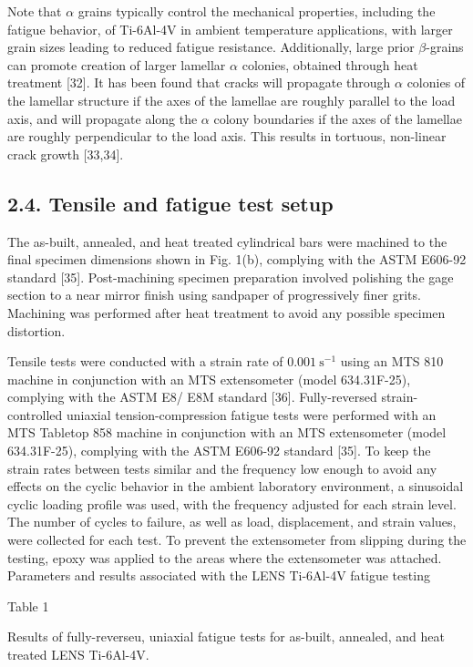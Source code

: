 \documentclass[10pt]{article}
\begin{document}
Note that $\alpha$ grains typically control the mechanical properties, including the fatigue behavior, of Ti-6Al-4V in ambient temperature applications, with larger grain sizes leading to reduced fatigue resistance. Additionally, large prior $\beta$-grains can promote creation of larger lamellar $\alpha$ colonies, obtained through heat treatment [32]. It has been found that cracks will propagate through $\alpha$ colonies of the lamellar structure if the axes of the lamellae are roughly parallel to the load axis, and will propagate along the $\alpha$ colony boundaries if the axes of the lamellae are roughly perpendicular to the load axis. This results in tortuous, non-linear crack growth [33,34].

\subsection*{2.4. Tensile and fatigue test setup}
The as-built, annealed, and heat treated cylindrical bars were machined to the final specimen dimensions shown in Fig. 1(b), complying with the ASTM E606-92 standard [35]. Post-machining specimen preparation involved polishing the gage section to a near mirror finish using sandpaper of progressively finer grits. Machining was performed after heat treatment to avoid any possible specimen distortion.

Tensile tests were conducted with a strain rate of $0.001 \mathrm{~s}^{-1}$ using an MTS 810 machine in conjunction with an MTS extensometer (model 634.31F-25), complying with the ASTM E8/ E8M standard [36]. Fully-reversed strain-controlled uniaxial tension-compression fatigue tests were performed with an MTS Tabletop 858 machine in conjunction with an MTS extensometer (model 634.31F-25), complying with the ASTM E606-92 standard [35]. To keep the strain rates between tests similar and the frequency low enough to avoid any effects on the cyclic behavior in the ambient laboratory environment, a sinusoidal cyclic loading profile was used, with the frequency adjusted for each strain level. The number of cycles to failure, as well as load, displacement, and strain values, were collected for each test. To prevent the extensometer from slipping during the testing, epoxy was applied to the areas where the extensometer was attached. Parameters and results associated with the LENS Ti-6Al-4V fatigue testing

Table 1

Results of fully-reverseu, uniaxial fatigue tests for as-built, annealed, and heat treated LENS Ti-6Al-4V.
\end{document}
